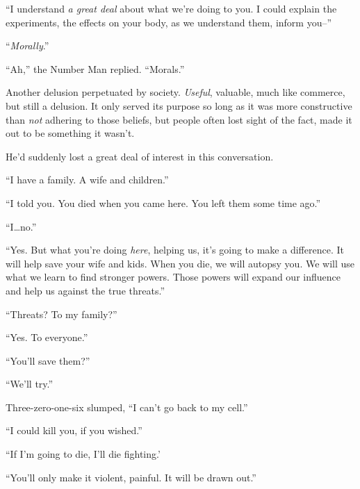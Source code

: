 ``I understand \emph{a great deal} about what we're doing to you.  I could explain the experiments, the effects on your body, as we understand them, inform you--''



``\emph{Morally}.''



``Ah,'' the Number Man replied.  ``Morals.''



Another delusion perpetuated by society.  \emph{Useful}, valuable, much like commerce, but still a delusion.  It only served its purpose so long as it was more constructive than \emph{not} adhering to those beliefs, but people often lost sight of the fact, made it out to be something it wasn't.



He'd suddenly lost a great deal of interest in this conversation.



``I have a family.  A wife and children.''



``I told you.  You died when you came here.  You left them some time ago.''



``I\ldots no.''



``Yes.  But what you're doing \emph{here}, helping us, it's going to make a difference.  It will help save your wife and kids.  When you die, we will autopsy you.  We will use what we learn to find stronger powers.  Those powers will expand our influence and help us against the true threats.''



``Threats?  To my family?''



``Yes.  To everyone.''



``You'll save them?''



``We'll try.''



Three-zero-one-six slumped, ``I can't go back to my cell.''



``I could kill you, if you wished.''



``If I'm going to die, I'll die fighting.'



``You'll only make it violent, painful.  It will be drawn out.''



